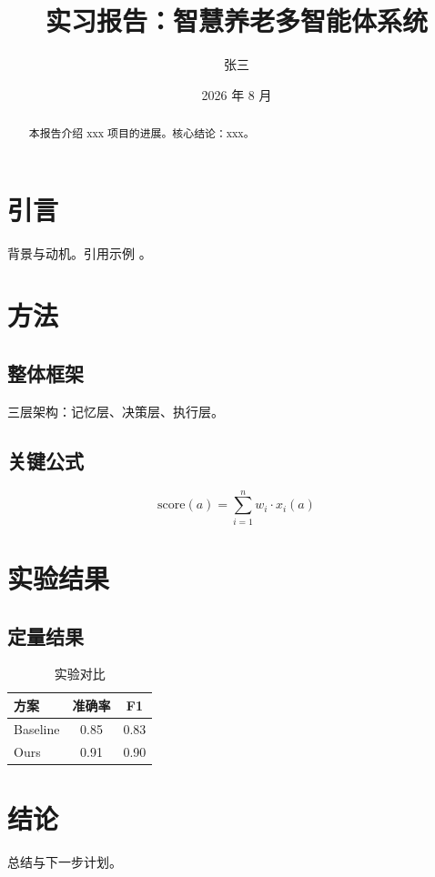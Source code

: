\documentclass{sjtureport}
\title{实习报告：智慧养老多智能体系统}
\author{张三}
\date{2026 年 8 月}
\begin{document}
\maketitle

\begin{abstract}
本报告介绍 xxx 项目的进展。核心结论：xxx。
\end{abstract}

\section{引言}
背景与动机。引用示例 \cite{sjtu2026}。

\section{方法}
\subsection{整体框架}
三层架构：记忆层、决策层、执行层。

\subsection{关键公式}
\begin{equation}
  \text{score}(a) = \sum_{i=1}^{n} w_i \cdot x_i(a)
\end{equation}

\section{实验结果}
\subsection{定量结果}
\begin{table}[h]
  \centering
  \begin{tabular}{lcc}
    \toprule
    方案 & 准确率 & F1 \\
    \midrule
    Baseline & 0.85 & 0.83 \\
    Ours     & 0.91 & 0.90 \\
    \bottomrule
  \end{tabular}
  \caption{实验对比}
\end{table}

\section{结论}
总结与下一步计划。

\printbibliography[heading=bibintoc]
\end{document}
